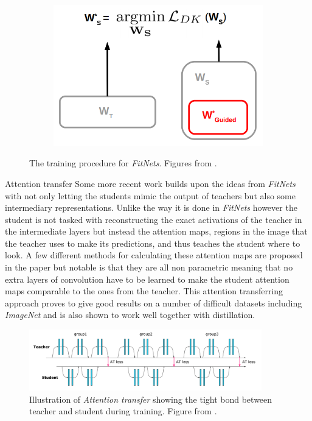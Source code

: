 \documentclass{kththesis}
\newcommand{\bibentry}[1]{\parencite{#1}}
\newcommand{\subsubsubsection}{}
\begin{document}
\begin{figure}[h]
    \begin{subfigure}[b]{0.3\textwidth}
        \includegraphics[width=\textwidth]{FitNet_C}
      \end{subfigure}
      \caption{The training procedure for \textit{FitNets}. Figures from \textcite[]{romero2014fitnets}.}\label{fig:FitNets}
      \label{fig:FitNet}
\end{figure}

\subsubsubsection{Attention transfer}
Some more recent work \bibentry{zagouruyko2017paying} builds upon the ideas from
\emph{FitNets} with not only letting the students mimic the output of teachers
but also some intermediary representations. Unlike the way it is done in
\emph{FitNets} however the student is not tasked with reconstructing the exact
activations of the teacher in the intermediate layers but instead the attention
maps, regions in the image that the teacher uses to make its predictions, and
thus teaches the student where to look. A few different methods for calculating
these attention maps are proposed in the paper but notable is that they are all
non parametric meaning that no extra layers of convolution have to be learned to
make the student attention maps comparable to the ones from the teacher. This
attention transferring approach proves to give good results on a number of
difficult datasets including \emph{ImageNet} and is also shown to work well
together with distillation. 

\begin{figure}[h]
  \centering
  \includegraphics[width=0.9\textwidth]{AttentionTransfer}
  \caption{Illustration of \textit{Attention transfer} showing the tight bond
    between teacher and student during training. Figure from \textcite[]{zagouruyko2017paying}.}
  \label{fig:AttentionTransfer}
\end{figure}
\end{document}
